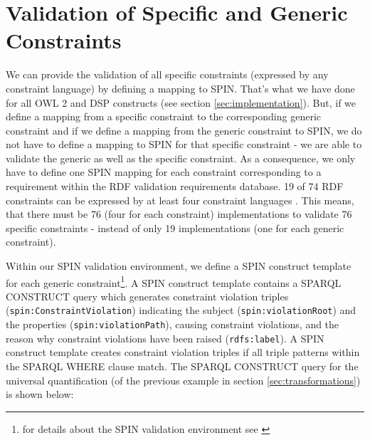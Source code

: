 \documentclass{llncs}
\newcommand{\ms}[1]{\texttt{#1}}
\begin{document}

\section{Validation of Specific and Generic Constraints}
\label{sec:validation}

We can provide the validation of all specific constraints (expressed by any constraint language) by defining a mapping to SPIN.
That's what we have done for all OWL 2 and DSP constructs (see section \ref{sec:implementation}).
But, if we define a mapping from a specific constraint to the corresponding generic constraint and if we define a mapping from the generic constraint to SPIN,
we do not have to define a mapping to SPIN for that specific constraint - 
we are able to validate the generic as well as the specific constraint.
As a consequence, we only have to define one SPIN mapping for each constraint corresponding to a requirement within the RDF validation requirements database.
19 of 74 RDF constraints can be expressed by at least four constraint languages \cite{BoschNolleAcarEckert2015}.
This means, that there must be 76 (four for each constraint) implementations to validate 76 specific constraints - instead of only 19 implementations (one for each generic constraint).

Within our SPIN validation environment, we define a SPIN construct template for each generic constraint\footnote{for details about the SPIN validation environment see \cite{BoschEckert2014-2}}.
A SPIN construct template contains a SPARQL CONSTRUCT query which generates constraint violation triples (\ms{spin:ConstraintViolation}) indicating the subject (\ms{spin:violationRoot}) and the properties (\ms{spin:violationPath}), causing constraint violations, and the reason why constraint violations have been raised (\ms{rdfs:label}).
A SPIN construct template creates constraint violation triples if all triple patterns within the SPARQL WHERE clause match.
The SPARQL CONSTRUCT query for the universal quantification (of the previous example in section \ref{sec:transformations}) is shown below:
\end{document}

